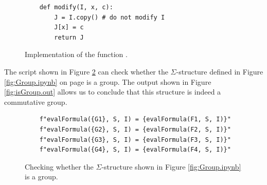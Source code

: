 \begin{figure}[!ht]
\centering
\begin{verbatim}
    def modify(I, x, c):
        J = I.copy() # do not modify I       
        J[x] = c
        return J
\end{verbatim}
\vspace*{-0.3cm}
\caption{Implementation of the function .}
\label{fig:modify.ipynb}
\end{figure}



The  script shown in Figure \ref{fig:isGroup.ipynb} can check whether the $\Sigma$-structure defined in
Figure \ref{fig:Group.ipynb} on page \pageref{fig:Group.ipynb} is a group. The output shown in Figure
\ref{fig:isGroup.out} allows us to conclude that this structure is indeed a commutative group. 


\begin{figure}[!ht]
\centering
\begin{verbatim}
    f"evalFormula({G1}, S, I) = {evalFormula(F1, S, I)}"
    f"evalFormula({G2}, S, I) = {evalFormula(F2, S, I)}"
    f"evalFormula({G3}, S, I) = {evalFormula(F3, S, I)}"
    f"evalFormula({G4}, S, I) = {evalFormula(F4, S, I)}"
\end{verbatim}
\vspace*{-0.3cm}
\caption{Checking whether the $\Sigma$-structure shown in Figure \ref{fig:Group.ipynb} is a group.}
\label{fig:isGroup.ipynb}
\end{figure}

